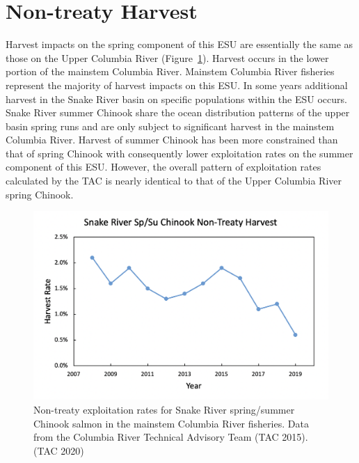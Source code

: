 \documentclass[
  letterpaper,
  oneside,
  open=any]{scrbook}
\begin{document}
\hypertarget{non-treaty-harvest-2}{%
\section{Non-treaty Harvest}\label{non-treaty-harvest-2}}

Harvest impacts on the spring component of this ESU are essentially the
same as those on the Upper Columbia River
(Figure~\ref{fig-SnR-SS-non-treaty-exploitation}). Harvest occurs in the
lower portion of the mainstem Columbia River. Mainstem Columbia River
fisheries represent the majority of harvest impacts on this ESU. In some
years additional harvest in the Snake River basin on specific
populations within the ESU occurs. Snake River summer Chinook share the
ocean distribution patterns of the upper basin spring runs and are only
subject to significant harvest in the mainstem Columbia River. Harvest
of summer Chinook has been more constrained than that of spring Chinook
with consequently lower exploitation rates on the summer component of
this ESU. However, the overall pattern of exploitation rates calculated
by the TAC is nearly identical to that of the Upper Columbia River
spring Chinook.

\begin{figure}

{\centering \includegraphics[width=5.39in,height=\textheight]{content/Interior_Columbia/../../media/image27b.png}

}

\caption{\label{fig-SnR-SS-non-treaty-exploitation}Non-treaty
exploitation rates for Snake River spring/summer Chinook salmon in the
mainstem Columbia River fisheries. Data from the Columbia River
Technical Advisory Team (TAC 2015).(TAC 2020)}

\end{figure}
\end{document}
